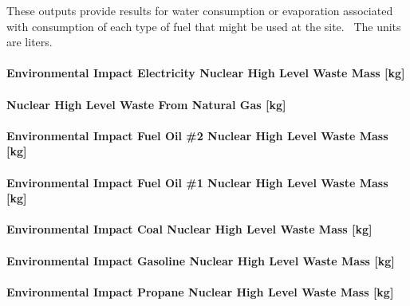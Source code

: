 These outputs provide results for water consumption or evaporation associated with consumption of each type of fuel that might be used at the site.~ The units are liters.

\paragraph{Environmental Impact Electricity Nuclear High Level Waste Mass {[}kg{]}}\label{environmental-impact-electricity-nuclear-high-level-waste-mass-kg}

\paragraph{Nuclear High Level Waste From Natural Gas {[}kg{]}}\label{nuclear-high-level-waste-from-natural-gas-kg}

\paragraph{Environmental Impact Fuel Oil \#2 Nuclear High Level Waste Mass {[}kg{]}}\label{environmental-impact-fuel-oil-2-nuclear-high-level-waste-mass-kg}

\paragraph{Environmental Impact Fuel Oil \#1 Nuclear High Level Waste Mass {[}kg{]}}\label{environmental-impact-fuel-oil-1-nuclear-high-level-waste-mass-kg}

\paragraph{Environmental Impact Coal Nuclear High Level Waste Mass {[}kg{]}}\label{environmental-impact-coal-nuclear-high-level-waste-mass-kg}

\paragraph{Environmental Impact Gasoline Nuclear High Level Waste Mass {[}kg{]}}\label{environmental-impact-gasoline-nuclear-high-level-waste-mass-kg}

\paragraph{Environmental Impact Propane Nuclear High Level Waste Mass {[}kg{]}}\label{environmental-impact-propane-nuclear-high-level-waste-mass-kg}


